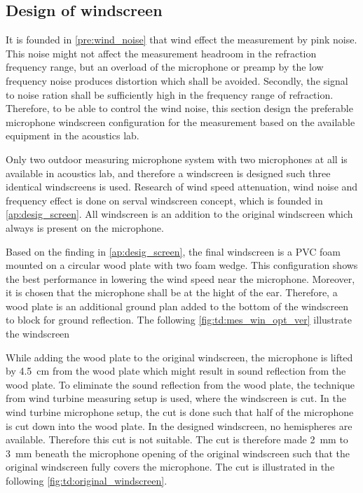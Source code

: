 \subsection{Design of windscreen}\label{ds:wind_scr}
It is founded in \autoref{pre:wind_noise} that wind effect the measurement by pink noise. This noise might not affect the measurement headroom in the refraction frequency range, but an overload of the microphone or preamp by the low frequency noise produces distortion which shall be avoided. Secondly, the signal to noise ration shall be sufficiently high in the frequency range of refraction. Therefore, to be able to control the wind noise, this section design the preferable microphone windscreen configuration for the measurement based on the available equipment in the acoustics lab. 

Only two outdoor measuring microphone system with two microphones at all is available in acoustics lab, and therefore a windscreen is designed such three identical windscreens is used. Research of wind speed attenuation, wind noise and frequency effect is done on serval windscreen concept, which is founded in \autoref{ap:desig_screen}. All windscreen is an addition to the original windscreen which always is present on the microphone. 

Based on the finding in \autoref{ap:desig_screen}, the final windscreen is a PVC foam mounted on a circular wood plate with two foam wedge. This configuration shows the best performance in lowering the wind speed near the microphone. Moreover, it is chosen that the microphone shall be at the hight of the ear. Therefore, a wood plate is an additional ground plan added to the bottom of the windscreen to block for ground reflection. The following \autoref{fig:td:mes_win_opt_ver} illustrate the windscreen


While adding the wood plate to the original windscreen, the microphone is lifted by \SI{4.5}{\centi\meter} from the wood plate which might result in sound reflection from the wood plate. To eliminate the sound reflection from the wood plate, the technique from wind turbine measuring setup is used, where the windscreen is cut. In the wind turbine microphone setup, the cut is done such that half of the microphone is cut down into the wood plate. In the designed windscreen, no hemispheres are available. Therefore this cut is not suitable. The cut is therefore made \SI{2}{\milli\meter} to \SI{3}{\milli\meter} beneath the microphone opening of the original windscreen such that the original windscreen fully covers the microphone. The cut is illustrated in the following \autoref{fig:td:original_windscreen}. 

